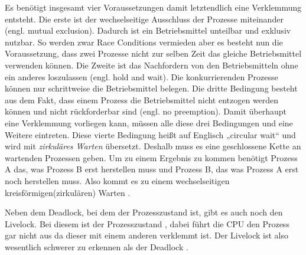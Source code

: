 Es benötigt insgesamt vier Voraussetzungen damit letztendlich eine Verklemmung entsteht. Die erste ist der wechselseitige Ausschluss der Prozesse miteinander (engl. mutual exclusion). Dadurch ist ein Betriebsmittel unteilbar und exklusiv nutzbar. So werden zwar Race Conditions vermieden aber es besteht nun die Voraussetzung, dass zwei Prozesse nicht zur selben Zeit das gleiche Betriebsmittel verwenden können. Die Zweite ist das Nachfordern von den Betriebsmitteln ohne ein anderes loszulassen (engl. hold and wait). Die konkurrierenden Prozesse können nur schrittweise die Betriebsmittel belegen. Die dritte Bedingung besteht aus dem Fakt, dass einem Prozess die Betriebsmittel nicht entzogen werden können und nicht rückforderbar sind (engl. no preemption). Damit überhaupt eine Verklemmung vorliegen kann, müssen alle diese drei Bedingungen und eine Weitere eintreten. Diese vierte Bedingung heißt auf Englisch „circular wait“ und wird mit \textit{zirkuläres Warten} übersetzt. Deshalb muss es eine geschlossene Kette an wartenden Prozessen geben. Um zu einem Ergebnis zu kommen benötigt Prozess A das, was Prozess B erst herstellen muss und Prozess B, das was Prozess A erst noch herstellen muss. Also kommt es zu einem wechselseitigen kreisförmigen(zirkulären) Warten \parencite[vgl.][S. 195f.]{baun2017}.

Neben dem Deadlock, bei dem der Prozesszustand   ist, gibt es auch noch den Livelock. Bei diesem ist der Prozesszustand , dabei führt die CPU den Prozess gar nicht aus da dieser mit einem anderen verklemmt ist. Der Livelock ist also wesentlich schwerer zu erkennen als der Deadlock \parencite[vgl.][S. 561 f.]{tanenbaum2016}.